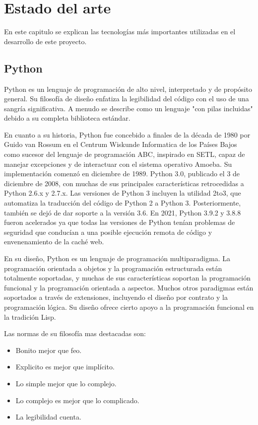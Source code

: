 \documentclass[a4paper, 12pt]{book}
\begin{document}
\cleardoublepage
\chapter{Estado del arte}
\label{chap:estado}

En este capitulo se explican las tecnologías más importantes utilizadas en el desarrollo de este proyecto.

\section{Python}
\label{sec:Python}

Python\cite{website:Python} es un lenguaje de programación de alto nivel, interpretado y de propósito general. Su filosofía de diseño enfatiza la legibilidad del código con el uso de una sangría significativa. A menudo se describe como un lenguaje "con pilas incluidas" debido a su completa biblioteca estándar. 

En cuanto a su historia, Python fue concebido a finales de la década de 1980 por Guido van Rossum en el Centrum Wiskunde Informatica de los Países Bajos como sucesor del lenguaje de programación ABC, inspirado en SETL, capaz de manejar excepciones y de interactuar con el sistema operativo Amoeba. Su implementación comenzó en diciembre de 1989. Python 3.0, publicado el 3 de diciembre de 2008, con muchas de sus principales características retrocedidas a Python 2.6.x y 2.7.x. Las versiones de Python 3 incluyen la utilidad 2to3, que automatiza la traducción del código de Python 2 a Python 3.
Posteriormente, también se dejó de dar soporte a la versión 3.6. En 2021, Python 3.9.2 y 3.8.8 fueron acelerados ya que todas las versiones de Python tenían problemas de seguridad que conducían a una posible ejecución remota de código y envenenamiento de la caché web.

En su diseño, Python es un lenguaje de programación multiparadigma. La programación orientada a objetos y la programación estructurada están totalmente soportadas, y muchas de sus características soportan la programación funcional y la programación orientada a aspectos. Muchos otros paradigmas están soportados a través de extensiones, incluyendo el diseño por contrato y la programación lógica. Su diseño ofrece cierto apoyo a la programación funcional en la tradición Lisp.

Las normas de su filosofía mas destacadas son:

\begin{itemize}
	\item Bonito mejor que feo.
	\item Explicito es mejor que implícito.
	\item Lo simple mejor que lo complejo.
	\item Lo complejo es mejor que lo complicado.
	\item La legibilidad cuenta.
\end{itemize}
\end{document}
